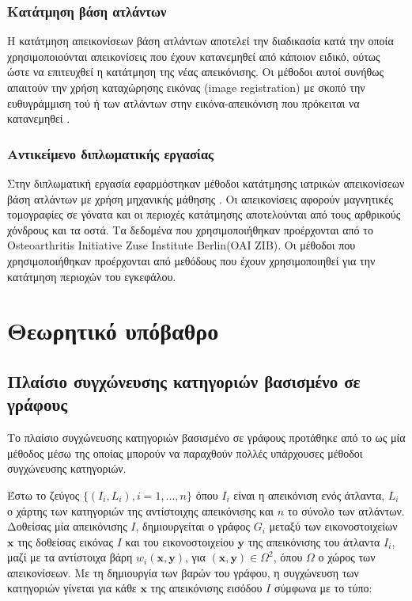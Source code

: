 \documentclass[a4paper,12pt]{article}
\begin{document}
\subsubsection{Κατάτμηση βάση ατλάντων}

Η κατάτμηση απεικονίσεων βάση ατλάντων αποτελεί την διαδικασία κατά την οποία
χρησιμοποιούνται απεικονίσεις που έχουν κατανεμηθεί από κάποιον ειδικό, ούτως
ώστε να επιτευχθεί η κατάτμηση της νέας απεικόνισης. Οι μέθοδοι αυτοί συνήθως
απαιτούν την χρήση καταχώρησης εικόνας (image registration) με σκοπό την
ευθυγράμμιση τού ή των ατλάντων στην εικόνα-απεικόνιση που πρόκειται να
κατανεμηθεί \cite{Registration_Segmentation:1}.

\subsubsection{Αντικείμενο διπλωματικής εργασίας}

Στην διπλωματική εργασία εφαρμόστηκαν μέθοδοι κατάτμησης ιατρικών απεικονίσεων
βάση ατλάντων με χρήση μηχανικής μάθησης \cite{Zhang:1} \cite{Tong:1}
\cite{Coupe:1}. Οι απεικονίσεις αφορούν μαγνητικές τομογραφίες σε γόνατα και οι
περιοχές κατάτμησης αποτελούνται από τους αρθρικούς χόνδρους και τα οστά. Τα
δεδομένα που χρησιμοποιήθηκαν προέρχονται από το Osteoarthritis Initiative Zuse
Institute Berlin(OAI ZIB). Οι μέθοδοι που χρησιμοποιήθηκαν προέρχονται από
μεθόδους που έχουν χρησιμοποιηθεί για την κατάτμηση περιοχών του εγκεφάλου.


\section{Θεωρητικό υπόβαθρο}

\subsection{Πλαίσιο συγχώνευσης κατηγοριών βασισμένο σε γράφους}
\label{Graph-Based_Framework:1}

Το πλαίσιο συγχώνευσης κατηγοριών βασισμένο σε γράφους προτάθηκε από
το \cite{Zhang:1} ως μία μέθοδος μέσω της οποίας μπορούν να παραχθούν πολλές
υπάρχουσες μέθοδοι συγχώνευσης κατηγοριών.

Έστω το ζεύγος $\{(I_i,L_i),i=1,...,n\}$ όπου $I_i$ είναι η απεικόνιση ενός
άτλαντα, $L_i$ ο χάρτης των κατηγοριών της αντίστοιχης απεικόνισης και $n$ το
σύνολο των ατλάντων. Δοθείσας μία απεικόνισης $I$, δημιουργείται ο γράφος $G_i$
μεταξύ των εικονοστοιχείων $\bm{x}$ της δοθείσας εικόνας $I$ και του
εικονοστοιχείου $\bm{y}$ της απεικόνισης του άτλαντα $I_i$, μαζί με τα
αντίστοιχα βάρη $w_i(\bm{x},\bm{y})$, για $(\bm{x},\bm{y})\in\Omega^2$, όπου
$\Omega$ ο χώρος των απεικονίσεων. Με τη δημιουργία των βαρών του γράφου, η
συγχώνευση των κατηγοριών γίνεται για κάθε $\bm{x}$ της απεικόνισης εισόδου $I$
σύμφωνα με το τύπο:
\end{document}
